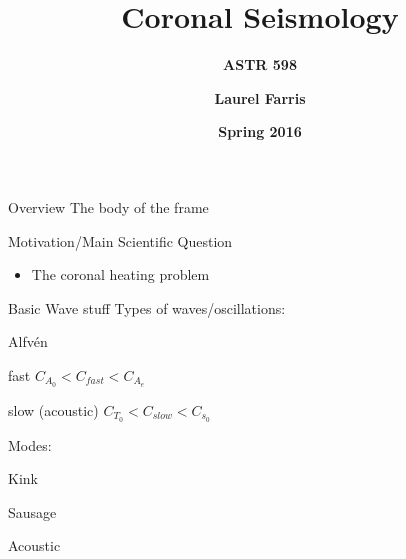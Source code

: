 \documentclass[table]{beamer}
\title{\textbf{Coronal Seismology}}
\subtitle{\textbf{ASTR 598}}
\date{\textbf{Spring 2016}}
\author{\textbf{Laurel Farris}}
\begin{document}
{
\begin{frame}
    \titlepage{}
\end{frame}}

\begin{frame}{Overview}
    The body of the frame
\end{frame}

\begin{frame}{Motivation/Main Scientific Question}
    \begin{itemize}
        \item The coronal heating problem
    \end{itemize}
\end{frame}

\begin{frame}{Basic Wave stuff}
    Types of waves/oscillations:
    \begin{itemize*}
        \item Alfv\'en
        \item fast $C_{A_0} < C_{fast} < C_{A_e} $
        \item slow (acoustic) $C_{T_0} < C_{slow} < C_{s_0} $
    \end{itemize*}
    Modes:
    \begin{itemize*}
        \item Kink
        \item Sausage
        \item Acoustic
    \end{itemize*}
\end{frame}
\end{document}
